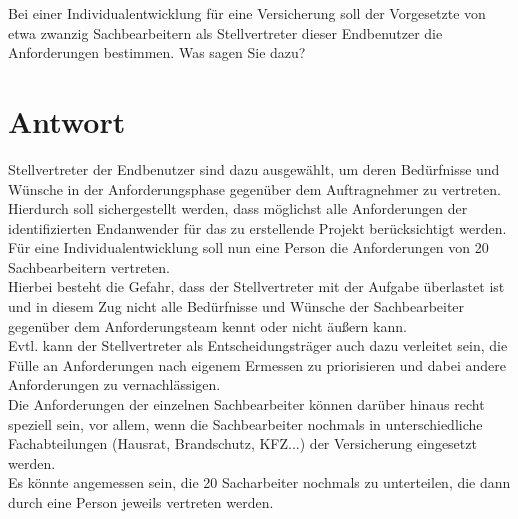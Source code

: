 Bei einer Individualentwicklung für eine Versicherung soll der Vorgesetzte von etwa
zwanzig Sachbearbeitern als Stellvertreter dieser Endbenutzer die Anforderungen
bestimmen. Was sagen Sie dazu?


\section*{Antwort}

Stellvertreter der Endbenutzer sind dazu ausgewählt, um deren Bedürfnisse und Wünsche in der Anforderungsphase gegenüber dem Auftragnehmer zu vertreten.\\
Hierdurch soll sichergestellt werden, dass möglichst alle Anforderungen der identifizierten Endanwender für das zu erstellende Projekt berücksichtigt werden.\\
Für eine Individualentwicklung soll nun eine Person die Anforderungen von 20 Sachbearbeitern vertreten.\\
Hierbei besteht die Gefahr, dass der Stellvertreter mit der Aufgabe überlastet ist und in diesem Zug nicht alle Bedürfnisse und Wünsche der Sachbearbeiter gegenüber dem Anforderungsteam kennt oder nicht äußern kann.\\
Evtl. kann der Stellvertreter als Entscheidungsträger auch dazu verleitet sein, die Fülle an Anforderungen nach eigenem Ermessen zu priorisieren und dabei andere Anforderungen zu vernachlässigen.\\

\noindent
Die Anforderungen der einzelnen Sachbearbeiter können darüber hinaus recht speziell sein, vor allem, wenn die Sachbearbeiter nochmals in unterschiedliche Fachabteilungen (Hausrat, Brandschutz, KFZ...) der Versicherung eingesetzt werden.\\
Es könnte angemessen sein, die 20 Sacharbeiter nochmals zu unterteilen, die dann durch eine Person jeweils vertreten werden.
